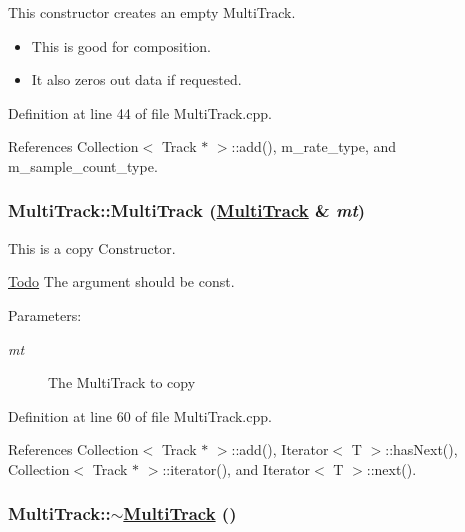 This constructor creates an empty Multi\-Track.\begin{itemize}
\item This is good for composition.\item It also zeros out data if requested. 
\end{itemize}


Definition at line 44 of file Multi\-Track.cpp.

References Collection$<$ Track $\ast$ $>$::add(), m\_\-rate\_\-type, and m\_\-sample\_\-count\_\-type.\hypertarget{classMultiTrack_a2}{
\subsubsection[MultiTrack]{\setlength{\rightskip}{0pt plus 5cm}Multi\-Track::Multi\-Track (\hyperlink{classMultiTrack}{Multi\-Track} \& {\em mt})}}
\label{classMultiTrack_a2}


This is a copy Constructor. 

\begin{Desc}
\item[\hyperlink{todo__todo000008}{Todo}]The argument should be const.\end{Desc}
\begin{Desc}
\item[Parameters:]
\begin{description}
\item[{\em mt}]The Multi\-Track to copy \end{description}
\end{Desc}


Definition at line 60 of file Multi\-Track.cpp.

References Collection$<$ Track $\ast$ $>$::add(), Iterator$<$ T $>$::has\-Next(), Collection$<$ Track $\ast$ $>$::iterator(), and Iterator$<$ T $>$::next().\hypertarget{classMultiTrack_a4}{
\subsubsection[$\sim$MultiTrack]{\setlength{\rightskip}{0pt plus 5cm}Multi\-Track::$\sim$\hyperlink{classMultiTrack}{Multi\-Track} ()}}
\label{classMultiTrack_a4}


